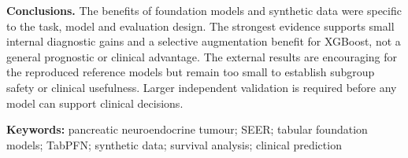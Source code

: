 \textbf{Conclusions.}
The benefits of foundation models and synthetic data were specific to the
task, model and evaluation design. The strongest evidence supports small
internal diagnostic gains and a selective augmentation benefit for XGBoost,
not a general prognostic or clinical advantage. The external results are
encouraging for the reproduced reference models but remain too small to
establish subgroup safety or clinical usefulness. Larger independent
validation is required before any model can support clinical decisions.

\vfill
\noindent\textbf{Keywords:} pancreatic neuroendocrine tumour; SEER; tabular
foundation models; TabPFN; synthetic data; survival analysis; clinical prediction
